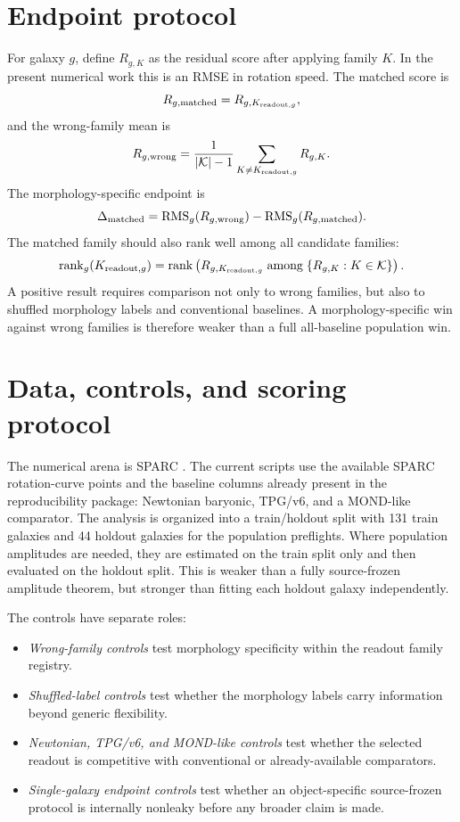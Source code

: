 \documentclass[11pt]{article}
\begin{document}
\section{Endpoint protocol}

For galaxy \(g\), define \(R_{g,K}\) as the residual score after applying family
\(K\).  In the present numerical work this is an RMSE in rotation speed.  The
matched score is
\[
R_{g,\rm matched}=R_{g,K_{{\rm readout},g}},
\]
and the wrong-family mean is
\[
R_{g,\rm wrong}=\frac{1}{|\mathcal{K}|-1}
\sum_{K\neq K_{{\rm readout},g}}R_{g,K}.
\]
The morphology-specific endpoint is
\[
\Delta_{\rm matched}
=
\mathrm{RMS}_{g}(R_{g,\rm wrong})
-
\mathrm{RMS}_{g}(R_{g,\rm matched}).
\]
The matched family should also rank well among all candidate families:
\[
\mathrm{rank}_{g}(K_{{\rm readout},g})
=
\mathrm{rank}\left(R_{g,K_{{\rm readout},g}}
\;\hbox{among}\;\{R_{g,K}:K\in\mathcal{K}\}\right).
\]
A positive result requires comparison not only to wrong families, but also to
shuffled morphology labels and conventional baselines.  A morphology-specific
win against wrong families is therefore weaker than a full all-baseline
population win.

\section{Data, controls, and scoring protocol}

The numerical arena is SPARC \cite{Lelli2016SPARC}.  The current scripts use
the available SPARC rotation-curve points and the baseline columns already
present in the reproducibility package: Newtonian baryonic, TPG/v6, and a
MOND-like comparator.  The analysis is organized into a train/holdout split
with 131 train galaxies and 44 holdout galaxies for the population preflights.
Where population amplitudes are needed, they are estimated on the train split
only and then evaluated on the holdout split.  This is weaker than a fully
source-frozen amplitude theorem, but stronger than fitting each holdout galaxy
independently.

The controls have separate roles:
\begin{itemize}[leftmargin=*]
\item \emph{Wrong-family controls} test morphology specificity within the
readout family registry.
\item \emph{Shuffled-label controls} test whether the morphology labels carry
information beyond generic flexibility.
\item \emph{Newtonian, TPG/v6, and MOND-like controls} test whether the selected
readout is competitive with conventional or already-available comparators.
\item \emph{Single-galaxy endpoint controls} test whether an object-specific
source-frozen protocol is internally nonleaky before any broader claim is made.
\end{itemize}
\end{document}
